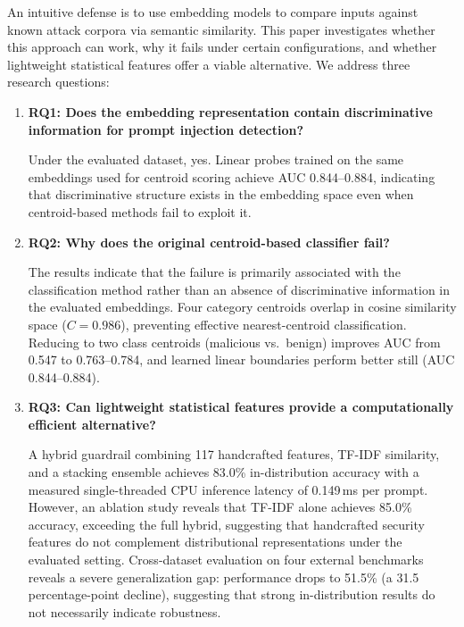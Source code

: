 \documentclass[12pt,a4paper]{article}
\begin{document}
An intuitive defense is to use embedding models to compare inputs against known attack corpora via semantic similarity. This paper investigates whether this approach can work, why it fails under certain configurations, and whether lightweight statistical features offer a viable alternative. We address three research questions:

\begin{enumerate}[leftmargin=*]
    \item \textbf{RQ1: Does the embedding representation contain discriminative information for prompt injection detection?}
    
    Under the evaluated dataset, yes. Linear probes trained on the same embeddings used for centroid scoring achieve AUC 0.844--0.884, indicating that discriminative structure exists in the embedding space even when centroid-based methods fail to exploit it.

    \item \textbf{RQ2: Why does the original centroid-based classifier fail?}
    
    The results indicate that the failure is primarily associated with the classification method rather than an absence of discriminative information in the evaluated embeddings. Four category centroids overlap in cosine similarity space ($C = 0.986$), preventing effective nearest-centroid classification. Reducing to two class centroids (malicious vs.\ benign) improves AUC from 0.547 to 0.763--0.784, and learned linear boundaries perform better still (AUC 0.844--0.884).

    \item \textbf{RQ3: Can lightweight statistical features provide a computationally efficient alternative?}
    
    A hybrid guardrail combining 117 handcrafted features, TF-IDF similarity, and a stacking ensemble achieves 83.0\% in-distribution accuracy with a measured single-threaded CPU inference latency of 0.149\,ms per prompt. However, an ablation study reveals that TF-IDF alone achieves 85.0\% accuracy, exceeding the full hybrid, suggesting that handcrafted security features do not complement distributional representations under the evaluated setting. Cross-dataset evaluation on four external benchmarks reveals a severe generalization gap: performance drops to 51.5\% (a 31.5 percentage-point decline), suggesting that strong in-distribution results do not necessarily indicate robustness.
\end{enumerate}
\end{document}
